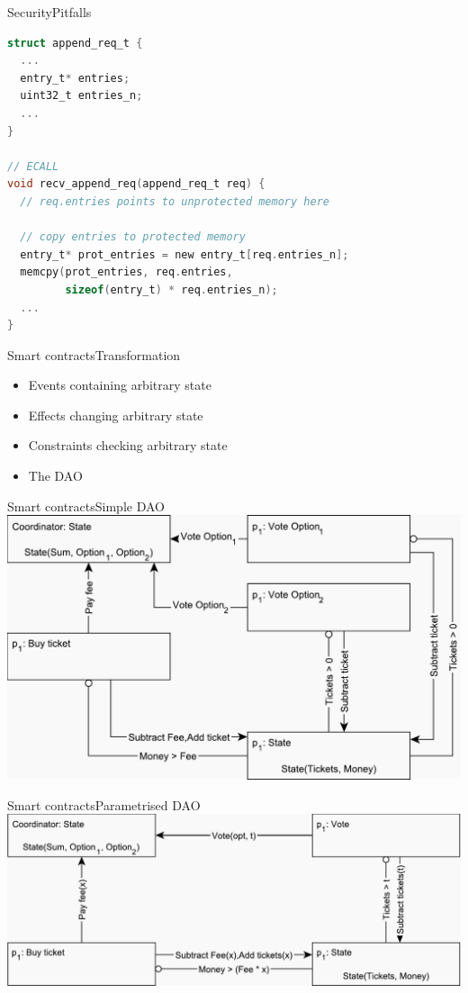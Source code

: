 \documentclass{beamer}
\begin{document}
\begin{frame}[fragile]{Security}{Pitfalls}%
  \vfill
  \begin{lstlisting}[language=C, basicstyle=\footnotesize\ttfamily, keywordstyle=\color{mLightBrown}, commentstyle=\color{gray}]
struct append_req_t {
  ...
  entry_t* entries;
  uint32_t entries_n;
  ...
}

// ECALL
void recv_append_req(append_req_t req) {
  // req.entries points to unprotected memory here

  // copy entries to protected memory
  entry_t* prot_entries = new entry_t[req.entries_n];
  memcpy(prot_entries, req.entries,
         sizeof(entry_t) * req.entries_n);
  ...
}
  \end{lstlisting}
  \vfill
\end{frame}

\begin{frame}{Smart contracts}{Transformation}%
    \begin{itemize}
    	\item Events containing arbitrary state
    	\vfill
    	\item Effects changing arbitrary state
    	\vfill
    	\item Constraints checking arbitrary state
    	\vfill
    	\item The DAO
    \end{itemize}
\end{frame}

\begin{frame}{Smart contracts}{Simple DAO}
	\centering
	\includegraphics[scale=0.5]{figures/dao-simple.pdf}
\end{frame}

\begin{frame}{Smart contracts}{Parametrised DAO}
	\centering
	\includegraphics[scale=0.5]{figures/dao-parametrised.pdf}
\end{frame}
\end{document}
